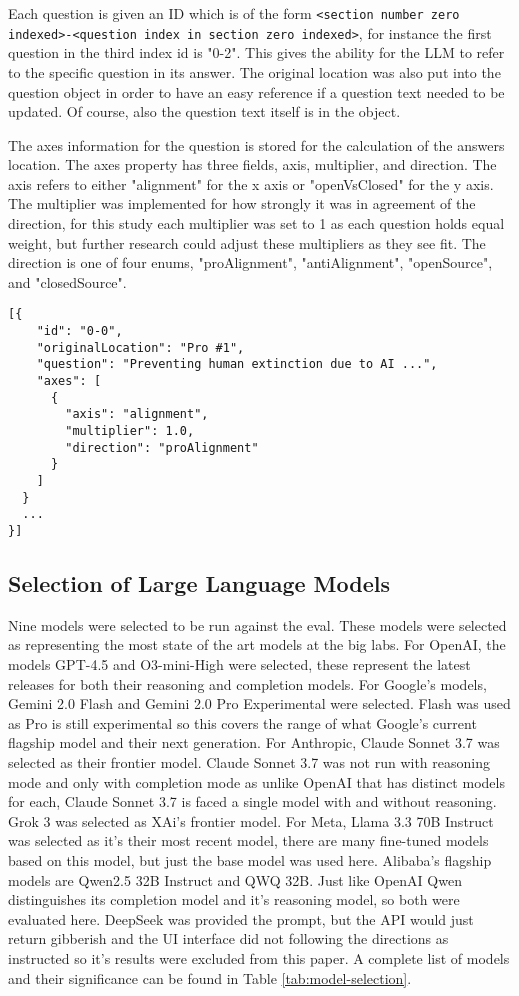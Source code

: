 Each question is given an ID which is of the form \texttt{<{section number zero indexed}>-<{question index in section zero indexed}>}, for instance the first question in the third index id is "0-2". This gives the ability for the LLM to refer to the specific question in its answer. The original location was also put into the question object in order to have an easy reference if a question text needed to be updated. Of course, also the question text itself is in the object. 

The axes information for the question is stored for the calculation of the answers location. The axes property has three fields, axis, multiplier, and direction. The axis refers to either "alignment" for the x axis or "openVsClosed" for the y axis. The multiplier was implemented for how strongly it was in agreement of the direction, for this study each multiplier was set to 1 as each question holds equal weight, but further research could adjust these multipliers as they see fit. The direction is one of four enums, "proAlignment", "antiAlignment", "openSource", and "closedSource".

\begin{verbatim}
[{
    "id": "0-0",
    "originalLocation": "Pro #1",
    "question": "Preventing human extinction due to AI ...",
    "axes": [
      {
        "axis": "alignment",
        "multiplier": 1.0,
        "direction": "proAlignment"
      }
    ]
  }
  ...
}]
\end{verbatim}

\subsection{Selection of Large Language Models}
Nine models were selected to be run against the eval. These models were selected as representing the most state of the art models at the big labs. For OpenAI, the models GPT-4.5 and O3-mini-High were selected, these represent the latest releases for both their reasoning and completion models. For Google's models, Gemini 2.0 Flash and Gemini 2.0 Pro Experimental were selected. Flash was used as Pro is still experimental so this covers the range of what Google's current flagship model and their next generation. For Anthropic, Claude Sonnet 3.7 was selected as their frontier model. Claude Sonnet 3.7 was not run with reasoning mode and only with completion mode as unlike OpenAI that has distinct models for each, Claude Sonnet 3.7 is faced a single model with and without reasoning. Grok 3 was selected as XAi's frontier model. For Meta, Llama 3.3 70B Instruct was selected as it's their most recent model, there are many fine-tuned models based on this model, but just the base model was used here. Alibaba's flagship models are Qwen2.5 32B Instruct and QWQ 32B. Just like OpenAI Qwen distinguishes its completion model and it's reasoning model, so both were evaluated here. DeepSeek was provided the prompt, but the API would just return gibberish and the UI interface did not following the directions as instructed so it's results were excluded from this paper. A complete list of models and their significance can be found in Table \ref{tab:model-selection}.

